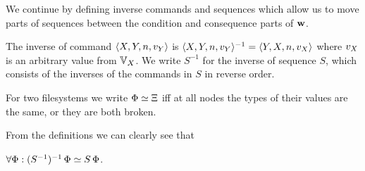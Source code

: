 \bigskip

\noindent
We continue by defining inverse commands and sequences
which allow us to move parts of sequences between the
condition and consequence parts of $\mathbf{w}$.

\begin{mydef}
The inverse of command $\langle{X,Y,n,v_Y}\rangle$ is $\langle{X,Y,n,v_Y}\rangle^{-1} = \langle{Y,X,n,v_X}\rangle$
where $v_X$ is an arbitrary value from $\mathbb{V}_{X}$.
We write $S^{-1}$ for the inverse of sequence $S$, which consists of the inverses of the commands in $S$
in reverse order.
\end{mydef}

\begin{mydef}[$\typeeq$]
For two filesystems we write $\Phi\simeq\Xi$
iff 
at all nodes the types of their values are the same, or they are both broken.
\end{mydef}

From the definitions we can clearly see that
\begin{mycor}\label{negneg_is_typeeq}
$\forall \Phi: (S^{-1})^{-1}\,\Phi\simeq S\,\Phi$.
\end{mycor}

